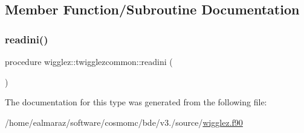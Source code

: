 \subsection{Member Function/\+Subroutine Documentation}
\mbox{\label{structwigglez_1_1twigglezcommon_ac47c6f73ef413629e4f3799fceddb072}} 
\subsubsection{\texorpdfstring{readini()}{readini()}}
{\footnotesize\ttfamily procedure wigglez\+::twigglezcommon\+::readini (\begin{DoxyParamCaption}{ }\end{DoxyParamCaption})\hspace{0.3cm}{\ttfamily [private]}}



The documentation for this type was generated from the following file\+:\begin{DoxyCompactItemize}
\item 
/home/ealmaraz/software/cosmomc/bde/v3./source/\mbox{\hyperlink{wigglez_8f90}{wigglez.\+f90}}\end{DoxyCompactItemize}
